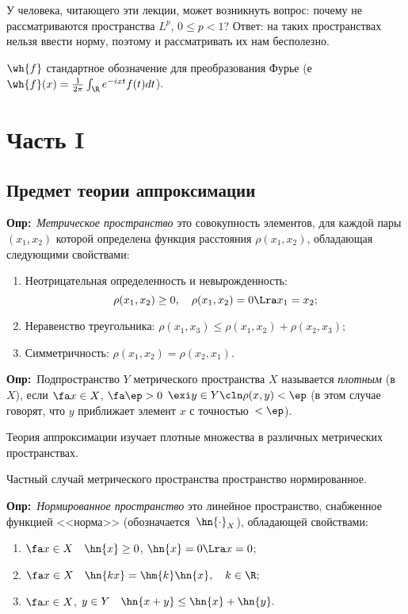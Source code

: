 \documentclass[a4paper]{article}
\def\defin{\noindent\textbf{Опр:}\ }
\begin{document}
\medskip

У человека, читающего эти лекции, может возникнуть вопрос: почему
не рассматриваются пространства $L^p$, $0\le p<1$? Ответ: на таких
пространствах нельзя ввести норму, поэтому и рассматривать их нам
бесполезно.

\medskip

$\wh{f}$ стандартное обозначение для преобразования Фурье (е
$\wh{f}(x)=\frac1{2\pi}\int_\R e^{-ixt}f(t)dt$).

\newpage

\tableofcontents
\newpage

\section{Часть I}

\subsection{Предмет теории аппроксимации}

\defin \emph{Метрическое пространство} это совокупность элементов, для каждой пары $(x_1,x_2)$ которой
определена функция расстояния $\rho(x_1,x_2)$, обладающая следующими свойствами:
\begin{enumerate}
  \item Неотрицательная определенность и невырожденность:
    $$\rho(x_1,x_2) \ge 0,\quad \rho(x_1,x_2)=0\Lra x_1=x_2;$$
  \item Неравенство треугольника: $\rho(x_1,x_3)\le\rho(x_1,x_2)+\rho(x_2,x_3)$;
  \item Симметричность: $\rho(x_1,x_2)=\rho(x_2,x_1)$.
\end{enumerate}

\defin Подпространство $Y$ метрического пространства $X$
называется \emph{плотным} (в $X$), если $\fa x\in X$, $\fa\ep>0$ $\exi y\in Y\cln \rho(x,y)<\ep$
(в этом случае говорят, что $y$ приближает элемент $x$ с точностью~$<\ep$).

Теория аппроксимации изучает плотные множества в различных метрических пространствах.

Частный случай метрического пространства пространство нормированное.

\defin \emph{Нормированное пространство} это линейное пространство, снабженное функцией
<<норма>> (обозначается~$\hn{\cdot}_X$), обладающей свойствами:
\begin{enumerate}
\item
$\fa x\in X\quad\hn{x}\ge 0$, $\hn{x}=0\Lra x=0$;
\item
$\fa x\in X\quad\hn{kx}=\hm{k}\hn{x},\quad k\in\R;$
\item
$\fa x\in X$, $y\in Y\quad\hn{x+y}\le\hn{x}+\hn{y}.$
\end{enumerate}
\end{document}
